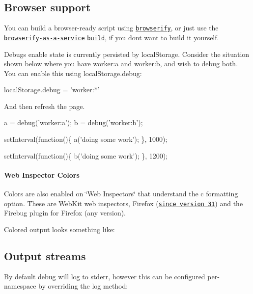 \subsection*{Browser support}

You can build a browser-\/ready script using \href{https://github.com/substack/node-browserify}{\tt browserify}, or just use the \href{https://wzrd.in/}{\tt browserify-\/as-\/a-\/service} \href{https://wzrd.in/standalone/debug@latest}{\tt build}, if you don\textquotesingle{}t want to build it yourself.

Debug\textquotesingle{}s enable state is currently persisted by {\ttfamily local\+Storage}. Consider the situation shown below where you have {\ttfamily worker\+:a} and {\ttfamily worker\+:b}, and wish to debug both. You can enable this using {\ttfamily local\+Storage.\+debug}\+:


\begin{DoxyCode}
localStorage.debug = 'worker:*'
\end{DoxyCode}


And then refresh the page.


\begin{DoxyCode}
a = debug('worker:a');
b = debug('worker:b');

setInterval(function()\{
  a('doing some work');
\}, 1000);

setInterval(function()\{
  b('doing some work');
\}, 1200);
\end{DoxyCode}


\paragraph*{Web Inspector Colors}

Colors are also enabled on \char`\"{}\+Web Inspectors\char`\"{} that understand the {\ttfamily c} formatting option. These are Web\+Kit web inspectors, Firefox (\href{https://hacks.mozilla.org/2014/05/editable-box-model-multiple-selection-sublime-text-keys-much-more-firefox-developer-tools-episode-31/}{\tt since version 31}) and the Firebug plugin for Firefox (any version).

Colored output looks something like\+:



\subsection*{Output streams}

By default {\ttfamily debug} will log to stderr, however this can be configured per-\/namespace by overriding the {\ttfamily log} method\+:

